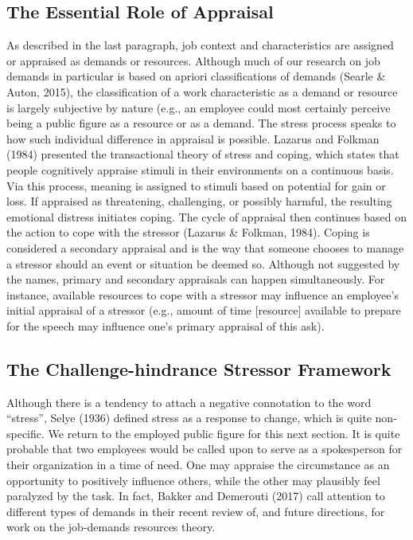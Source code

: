 \documentclass[
  man]{apa6}
\begin{document}
\hypertarget{the-essential-role-of-appraisal}{%
\subsection{The Essential Role of Appraisal}\label{the-essential-role-of-appraisal}}

As described in the last paragraph, job context and characteristics are assigned or appraised as demands or resources. Although much of our research on job demands in particular is based on apriori classifications of demands (Searle \& Auton, 2015), the classification of a work characteristic as a demand or resource is largely subjective by nature (e.g., an employee could most certainly perceive being a public figure as a resource or as a demand. The stress process speaks to how such individual difference in appraisal is possible. Lazarus and Folkman (1984) presented the transactional theory of stress and coping, which states that people cognitively appraise stimuli in their environments on a continuous basis. Via this process, meaning is assigned to stimuli based on potential for gain or loss. If appraised as threatening, challenging, or possibly harmful, the resulting emotional distress initiates coping. The cycle of appraisal then continues based on the action to cope with the stressor (Lazarus \& Folkman, 1984). Coping is considered a secondary appraisal and is the way that someone chooses to manage a stressor should an event or situation be deemed so. Although not suggested by the names, primary and secondary appraisals can happen simultaneously. For instance, available resources to cope with a stressor may influence an employee's initial appraisal of a stressor (e.g., amount of time {[}resource{]} available to prepare for the speech may influence one's primary appraisal of this ask).

\hypertarget{the-challenge-hindrance-stressor-framework}{%
\subsection{The Challenge-hindrance Stressor Framework}\label{the-challenge-hindrance-stressor-framework}}

Although there is a tendency to attach a negative connotation to the word ``stress'', Selye (1936) defined stress as a response to change, which is quite non-specific. We return to the employed public figure for this next section. It is quite probable that two employees would be called upon to serve as a spokesperson for their organization in a time of need. One may appraise the circumstance as an opportunity to positively influence others, while the other may plausibly feel paralyzed by the task. In fact, Bakker and Demerouti (2017) call attention to different types of demands in their recent review of, and future directions, for work on the job-demands resources theory.
\end{document}
